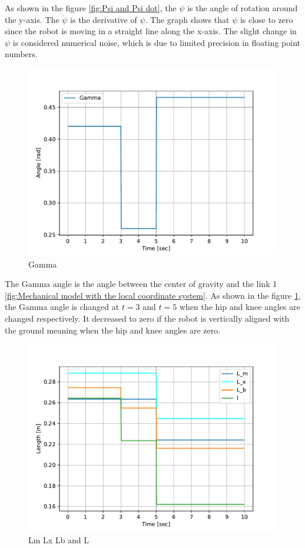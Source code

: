 As shown in the figure \ref{fig:Psi and Psi dot}, the $\psi$ is the angle of rotation around the y-axis. The $\dot{\psi}$ is the derivative of $\psi$. The graph shows that $\psi$ is close to zero since the robot is moving in a straight line along the x-axis. The slight change in $\psi$  is considered numerical noise, which is due to limited precision in floating point numbers.
\vspace{3cm}
\begin{figure}[h]
	\centering
	\includegraphics[width=.5\textwidth]{Gamma}
	\caption{Gamma}
	\label{fig:Gamma}
\end{figure}

The Gamma angle is the angle between the center of gravity and the link 1 \ref{fig:Mechanical model with the local coordinate system}. As shown in the figure \ref{fig:Gamma}, the Gamma angle is changed at $t=3$ and $t=5$ when the hip and knee angles are changed respectively. It decreased to zero if the robot is vertically aligned with the ground meaning when the hip and knee angles are zero.
\begin{figure}[h]
	\centering
	\includegraphics[width=.5\textwidth]{L_m L_x L_b L}
	\caption{Lm Lx Lb and L}
	\label{fig:Lm Lx Lb and L}
\end{figure}

